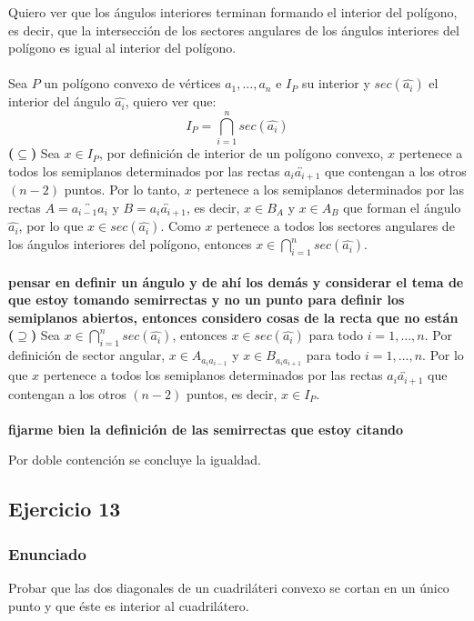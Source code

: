 \documentclass[a4paper]{article}
\begin{document}
Quiero ver que los ángulos interiores terminan formando el interior del polígono, es decir, que la intersección de los sectores angulares de los ángulos interiores del polígono es igual al interior del polígono.\\\\
Sea $P$ un polígono convexo de vértices $a_1,\dots,a_n$ e $I_P$ su interior y $sec(\hat{a_i})$ el interior del ángulo $\hat{a_i}$, quiero ver que:
\begin{equation}
    I_P = \bigcap_{i=1}^{n} sec(\hat{a_i})
\end{equation}
\textbf{($\subseteq$)} Sea $x \in I_P$, por definición de interior de un polígono convexo, $x$ pertenece a todos los semiplanos determinados por las rectas $\overleftrightarrow{a_ia_{i+1}}$ que contengan a los otros $(n-2)$ puntos. Por lo tanto, $x$ pertenece a los semiplanos determinados por las rectas $A=\overleftrightarrow{a_{i-1}a_i}$ y $B=\overleftrightarrow{a_ia_{i+1}}$, es decir, $x \in B_A$ y $x \in A_B$ que forman el ángulo $\hat{a_i}$, por lo que $x \in sec(\hat{a_i})$. Como $x$ pertenece a todos los sectores angulares de los ángulos interiores del polígono, entonces $x \in \bigcap_{i=1}^{n} sec(\hat{a_i})$.\\\\
\textbf{pensar en definir un ángulo y de ahí los demás y considerar el tema de que estoy tomando semirrectas y no un punto para definir los semiplanos abiertos, entonces considero cosas de la recta que no están}\\
\textbf{($\supseteq$)} Sea $x \in \bigcap_{i=1}^{n} sec(\hat{a_i})$, entonces $x \in sec(\hat{a_i})$ para todo $i=1,\dots,n$. Por definición de sector angular, $x \in A_{a_ia_{i-1}}$ y $x \in B_{a_ia_{i+1}}$ para todo $i=1,\dots,n$. Por lo que $x$ pertenece a todos los semiplanos determinados por las rectas $\overleftrightarrow{a_ia_{i+1}}$ que contengan a los otros $(n-2)$ puntos, es decir, $x \in I_P$.\\\\
\textbf{fijarme bien la definición de las semirrectas que estoy citando}

Por doble contención se concluye la igualdad.
\subsection{Ejercicio 13}
\subsubsection{Enunciado}
Probar que las dos diagonales de un cuadriláteri convexo se cortan en un único punto y que éste es interior al cuadrilátero.
\end{document}
